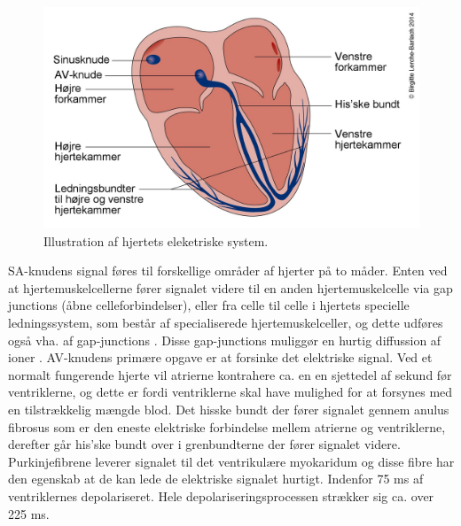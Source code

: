 \begin{figure}[H] %
\begin{center}
\includegraphics[width=1\textwidth]{figures/hjerte_elektrisk}
\end{center}
\caption{Illustration af hjertets eleketriske system.\cite{elektriske}}
\label{fig:hjerte_elektriske}
\end{figure}

SA-knudens signal føres til forskellige områder af hjerter på to måder. Enten ved at hjertemuskelcellerne fører signalet videre til en anden hjertemuskelcelle via gap junctions (åbne celleforbindelser), eller fra celle til celle i hjertets specielle ledningssystem, som består af specialiserede hjertemuskelceller, og dette udføres også vha. af gap-junctions \cite{gronanatomi}. 
Disse gap-junctions muliggør en hurtig diffussion af ioner \cite{guyton}.
AV-knudens primære opgave er at  forsinke det elektriske signal. Ved et normalt fungerende hjerte vil atrierne kontrahere ca. en en sjettedel af sekund før ventriklerne, og dette er fordi ventriklerne skal have mulighed for at forsynes med en tilstrækkelig mængde blod\cite{guyton}.
Det hisske bundt der fører signalet gennem anulus fibrosus som er den eneste elektriske forbindelse mellem atrierne og ventriklerne, derefter går his'ske bundt over i grenbundterne der fører signalet videre. Purkinjefibrene leverer signalet til det ventrikulære myokaridum og disse fibre har den egenskab at de kan lede de elektriske signalet hurtigt. Indenfor 75 ms af ventriklernes depolariseret\cite{gronanatomi}. Hele depolariseringsprocessen strækker sig ca. over 225 ms.



